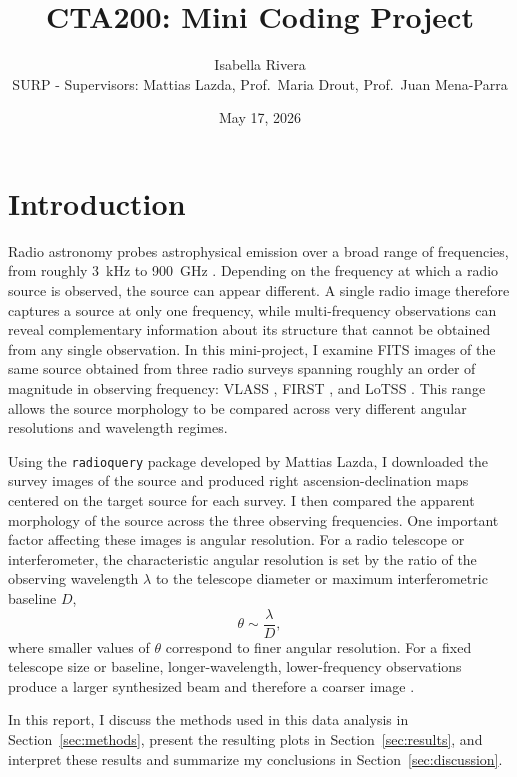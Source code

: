 \documentclass[11pt]{article}
\title{CTA200: Mini Coding Project}
\author{Isabella Rivera \\
  \small SURP - Supervisors: Mattias Lazda, Prof.\ Maria Drout, Prof.\ Juan Mena-Parra}
\date{May 17, 2026}
\begin{document}
\maketitle

\section{Introduction}
\label{sec:intro}

Radio astronomy probes astrophysical emission over a broad range of frequencies, from roughly 3~kHz to 900~GHz \citep{nrao_radio}. Depending on the frequency at which a radio source is observed, the source can appear different. A single radio image therefore captures a source at only one frequency, while multi-frequency observations can reveal complementary information about its structure that cannot be obtained from any single observation. In this mini-project, I examine FITS images of the same source obtained from three radio surveys spanning roughly an order of magnitude in observing frequency: VLASS \citep[Very Large Array Sky Survey, 3~GHz;][]{lacy_2020}, FIRST \citep[Faint Images of the Radio Sky at Twenty centimeters, 1.4~GHz;][]{becker_1995}, and LoTSS \citep[LOFAR Two-metre Sky Survey, 300~MHz;][]{shimwell_2017}. This range allows the source morphology to be compared across very different angular resolutions and wavelength regimes.

Using the \texttt{radioquery} package developed by Mattias Lazda, I downloaded the survey images of the source and produced right ascension-declination maps centered on the target source for each survey. I then compared the apparent morphology of the source across the three observing frequencies. One important factor affecting these images is angular resolution. For a radio telescope or interferometer, the characteristic angular resolution is set by the ratio of the observing wavelength $\lambda$ to the telescope diameter or maximum interferometric baseline $D$,
%
\begin{equation}
  \theta \sim \frac{\lambda}{D},
  \label{eq:resolution}
\end{equation}
%
where smaller values of $\theta$ correspond to finer angular resolution. For a fixed telescope size or baseline, longer-wavelength,
lower-frequency observations produce a larger synthesized beam and therefore a coarser image \citep{condon_ransom_2016}.

In this report, I discuss the methods used in this data analysis in Section~\ref{sec:methods}, present the resulting plots in Section~\ref{sec:results}, and interpret these results and summarize my conclusions in Section~\ref{sec:discussion}.
\end{document}
